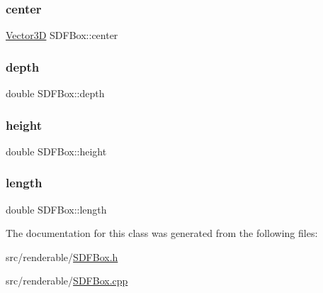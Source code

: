 \mbox{\label{classSDFBox_ab3c5b09a3c42843c995e28c3ee766c01}} 
\subsubsection{\texorpdfstring{center}{center}}
{\footnotesize\ttfamily \mbox{\hyperlink{classVector3D}{Vector3D}} S\+D\+F\+Box\+::center\hspace{0.3cm}{\ttfamily [private]}}

\mbox{\label{classSDFBox_a2e6708728c6bcadde76fdec645759ec7}} 
\subsubsection{\texorpdfstring{depth}{depth}}
{\footnotesize\ttfamily double S\+D\+F\+Box\+::depth\hspace{0.3cm}{\ttfamily [private]}}

\mbox{\label{classSDFBox_a4be5004a92e2e6af1391287d46539a90}} 
\subsubsection{\texorpdfstring{height}{height}}
{\footnotesize\ttfamily double S\+D\+F\+Box\+::height\hspace{0.3cm}{\ttfamily [private]}}

\mbox{\label{classSDFBox_a4e1fe9cab3361dcb2e57e5c639d1d56d}} 
\subsubsection{\texorpdfstring{length}{length}}
{\footnotesize\ttfamily double S\+D\+F\+Box\+::length\hspace{0.3cm}{\ttfamily [private]}}



The documentation for this class was generated from the following files\+:\begin{DoxyCompactItemize}
\item 
src/renderable/\mbox{\hyperlink{SDFBox_8h}{S\+D\+F\+Box.\+h}}\item 
src/renderable/\mbox{\hyperlink{SDFBox_8cpp}{S\+D\+F\+Box.\+cpp}}\end{DoxyCompactItemize}
